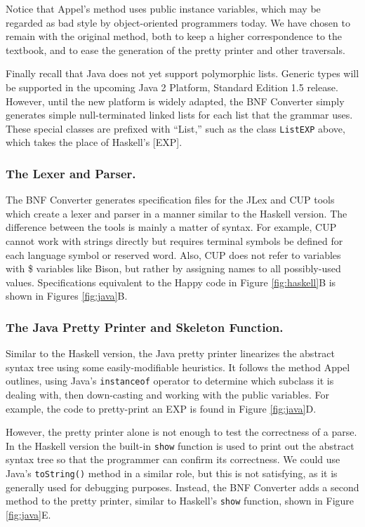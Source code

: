 \documentclass{llncs}
\newcommand{\shortsection}[1]{\subsubsection*{#1.}} %
\begin{document}
Notice that Appel's method uses public instance variables, which may be regarded as bad style by object-oriented programmers today. We have chosen to remain with the original method, both to keep a higher correspondence to the textbook, 
and to ease the generation of the pretty printer and other traversals.

Finally recall that Java does not yet support polymorphic lists. Generic types will be supported in the upcoming Java 2 Platform, Standard Edition 1.5 release. However, until the new platform is widely adapted, the BNF Converter simply generates simple null-terminated linked lists for each list that the grammar uses. These special classes are prefixed with ``List,'' such as the class \texttt{ListEXP} above, which takes the place of Haskell's [EXP].

\shortsection{The Lexer and Parser}

The BNF Converter generates specification files for the JLex \cite{jlex} and CUP \cite{cup} tools which create a lexer and parser in a manner similar to the Haskell version. The difference between the tools is mainly a matter of syntax. For example, CUP cannot work with strings directly but requires terminal symbols be defined for each language symbol or reserved word. Also, CUP does not refer to variables with \$ variables like Bison, but rather by assigning names to all possibly-used values. Specifications equivalent to the Happy code in Figure \ref{fig:haskell}B is shown in Figures \ref{fig:java}B.

\shortsection{The Java Pretty Printer and Skeleton Function}
\label{javapp}

Similar to the Haskell version, the Java pretty printer linearizes the abstract syntax tree using some easily-modifiable heuristics. It follows the method Appel outlines, using Java's \texttt{instanceof} operator to determine which subclass it is dealing with, then down-casting and working with the public variables. For example, the code to pretty-print an EXP is found in Figure \ref{fig:java}D.

However, the pretty printer alone is not enough to test the correctness of a parse. In the Haskell version the built-in \texttt{show} function is used to print out the abstract syntax tree so that the programmer can confirm its correctness. We could use Java's \texttt{toString()} method in a similar role, but this is not satisfying, as it is generally used for debugging purposes. Instead, the BNF Converter adds a second method to the pretty printer, similar to Haskell's \texttt{show} function, shown in Figure \ref{fig:java}E.
\end{document}
